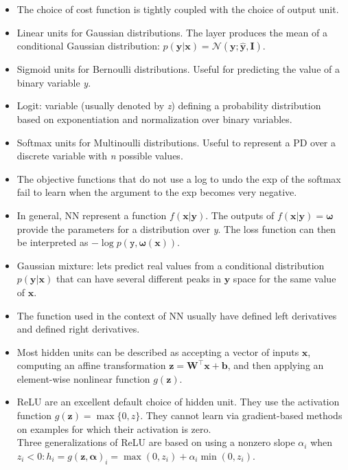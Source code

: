 \documentclass{article}
\begin{document}
\begin{itemize}
\item The choice of cost function is tightly coupled with the choice of output unit.
\item Linear units for Gaussian distributions. The layer produces the mean of a conditional Gaussian distribution: \(p(\boldsymbol{y} | \boldsymbol{x}) = \mathcal{N}(\boldsymbol{y}; \hat{\boldsymbol{y}}, \boldsymbol{I})\).
\item Sigmoid units for Bernoulli distributions. Useful for predicting the value of a binary variable \textit{y}.
\item Logit: variable (usually denoted by \textit{z}) defining a probability distribution based on exponentiation and normalization over binary variables.
\item Softmax units for Multinoulli distributions. Useful to represent a PD over a discrete variable with \textit{n} possible values.
\item The objective functions that do not use a log to undo the exp of the softmax fail to learn when the argument to the exp becomes very negative.
\item In general, NN represent a function \(f(\boldsymbol{x}| \boldsymbol{y})\). The outputs of \(f(\boldsymbol{x}| \boldsymbol{y}) = \boldsymbol{\omega}\) provide the parameters for a distribution over \textit{y}. The loss function can then be interpreted as \(-\log{p(\boldsymbol{\mathtt{y}}, \boldsymbol{\omega} (\boldsymbol{x}))}\).
\item Gaussian mixture: lets predict real values from a conditional distribution \(p(\boldsymbol{y} | \boldsymbol{x})\) that can have several different peaks in \(\boldsymbol{y}\) space for the same value of \(\boldsymbol{x}\).
\item The function used in the context of NN usually have defined left derivatives and defined right derivatives.
\item Most hidden units can be described as accepting a vector of inputs \(\boldsymbol{x}\), computing an affine transformation \(\boldsymbol{z} = \boldsymbol{W}^\top \boldsymbol{x} + \boldsymbol{b}\), and then applying an element-wise nonlinear function \(g(\boldsymbol{z})\).
\item ReLU are an excellent default choice of hidden unit. They use the activation function \(g(\boldsymbol{z}) = \max{\{0, z\}}\). They cannot learn via gradient-based methods on examples for which their activation is zero.\\Three generalizations of ReLU are based on using a nonzero slope \(\alpha_i\) when \(z_i < 0: h_i = g(\boldsymbol{z}, \boldsymbol{\alpha})_i = \max{(0, z_i)} + \alpha_i\min{(0, z_i)}\).

\end{itemize}
\end{document}
